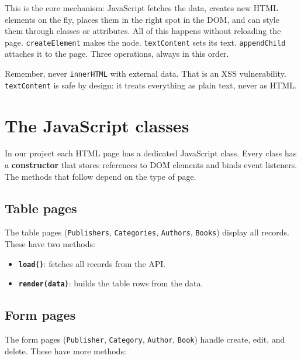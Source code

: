 \documentclass[11pt,a4paper,oneside]{book}
\providecommand{\tightlist}{%
  \setlength{\itemsep}{0pt}\setlength{\parskip}{0pt}}
\begin{document}
This is the core mechanism: JavaScript fetches the data, creates
new HTML elements on the fly, places them in the right spot in
the DOM, and can style them through classes or attributes. All of
this happens without reloading the page. \texttt{createElement}
makes the node. \texttt{textContent} sets its text.
\texttt{appendChild} attaches it to the page. Three operations,
always in this order.

Remember, never \texttt{innerHTML} with external data. That is an
XSS vulnerability. \texttt{textContent} is safe by design: it
treats everything as plain text, never as HTML.

\hypertarget{the-javascript-classes}{%
\section{The JavaScript classes}\label{the-javascript-classes}}

In our project each HTML page has a dedicated JavaScript class.
Every class has a \textbf{constructor} that stores references to
DOM elements and binds event listeners. The methods that follow
depend on the type of page.

\hypertarget{table-pages}{%
\subsection{Table pages}\label{table-pages}}

The table pages (\texttt{Publishers}, \texttt{Categories},
\texttt{Authors}, \texttt{Books}) display all records. These have
two methods:

\begin{itemize}
\tightlist
\item
  \textbf{\texttt{load()}}: fetches all records from the API.
\item
  \textbf{\texttt{render(data)}}: builds the table rows from the
  data.
\end{itemize}

\hypertarget{form-pages}{%
\subsection{Form pages}\label{form-pages}}

The form pages (\texttt{Publisher}, \texttt{Category},
\texttt{Author}, \texttt{Book}) handle create, edit, and delete.
These have more methods:
\end{document}
